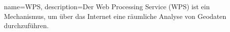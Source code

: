 {
    name=WPS,
    description={Der Web Processing Service (WPS) ist ein Mechanismus, um über das Internet eine räumliche Analyse von Geodaten durchzuführen.}
}












